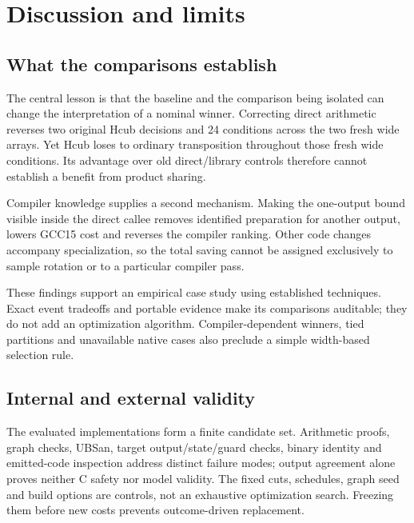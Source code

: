 \documentclass[conference]{IEEEtran}
\begin{document}
\FloatBarrier

\section{Discussion and limits}\label{discussion-and-limits}

\subsection{What the comparisons establish}\label{what-the-comparisons-establish}

The central lesson is that the baseline and the comparison being
isolated can change the interpretation of a nominal winner. Correcting
direct arithmetic reverses two original Hcub decisions and 24 conditions
across the two fresh wide arrays. Yet Hcub loses to ordinary
transposition throughout those fresh wide conditions. Its advantage over
old direct/library controls therefore cannot establish a benefit from
product sharing.

Compiler knowledge supplies a second mechanism. Making the one-output
bound visible inside the direct callee removes identified preparation
for another output, lowers GCC15 cost and reverses the compiler ranking.
Other code changes accompany specialization, so the total saving cannot
be assigned exclusively to sample rotation or to a particular compiler
pass.

These findings support an empirical case study using established
techniques. Exact event tradeoffs and portable evidence make its
comparisons auditable; they do not add an optimization algorithm.
Compiler-dependent winners, tied partitions and unavailable native cases
also preclude a simple width-based selection rule.

\subsection{Internal and external validity}\label{internal-and-external-validity}

The evaluated implementations form a finite candidate set. Arithmetic
proofs, graph checks, UBSan, target output/state/guard checks, binary
identity and emitted-code inspection address distinct failure modes;
output agreement alone proves neither C safety nor model validity. The
fixed cuts, schedules, graph seed and build options are controls, not an
exhaustive optimization search. Freezing them before new costs prevents
outcome-driven replacement.
\end{document}
